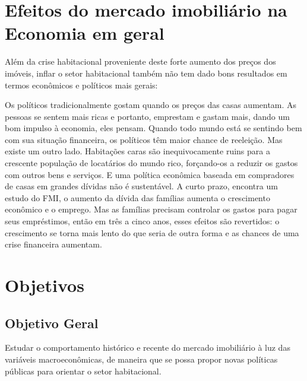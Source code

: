 \documentclass[
	12pt,				%
	oneside,			%
	a4paper,			%
	chapter=TITLE,		%
	section=TITLE,		%
	english,			%
	brazil				%
	]{abntex2}
\begin{document}
\hypertarget{efeitos-do-mercado-imobiliuxe1rio-na-economia-em-geral}{%
\section{Efeitos do mercado imobiliário na Economia em geral}\label{efeitos-do-mercado-imobiliuxe1rio-na-economia-em-geral}}

Além da crise habitacional proveniente deste forte aumento dos preços dos
imóveis, inflar o setor habitacional também não tem dado bons resultados em
termos econômicos e políticos mais gerais:
\begin{citacao}
Os políticos tradicionalmente gostam quando os preços das casas aumentam. As
pessoas se sentem mais ricas e portanto, emprestam e gastam mais, dando um bom
impulso à economia, eles pensam. Quando todo mundo está se sentindo bem com sua
situação financeira, os políticos têm maior chance de reeleição. Mas existe um
outro lado. Habitações caras são inequivocamente ruins para a crescente
população de locatários do mundo rico, forçando-os a reduzir os gastos com
outros bens e serviços. E uma política econômica baseada em compradores de casas
em grandes dívidas não é sustentável. A curto prazo, encontra um estudo do FMI,
o aumento da dívida das famílias aumenta o crescimento econômico e o emprego.
Mas as famílias precisam controlar os gastos para pagar seus empréstimos, então
em três a cinco anos, esses efeitos são revertidos: o crescimento se torna mais
lento do que seria de outra forma e as chances de uma crise financeira aumentam.
\cite{economist-housing-2020}
\end{citacao}
\hypertarget{objetivos}{%
\section{Objetivos}\label{objetivos}}

\hypertarget{objetivo-geral}{%
\subsection{Objetivo Geral}\label{objetivo-geral}}

Estudar o comportamento histórico e recente do mercado imobiliário à luz das
variáveis macroeconômicas, de maneira que se possa propor novas políticas
públicas para orientar o setor habitacional.
\end{document}
